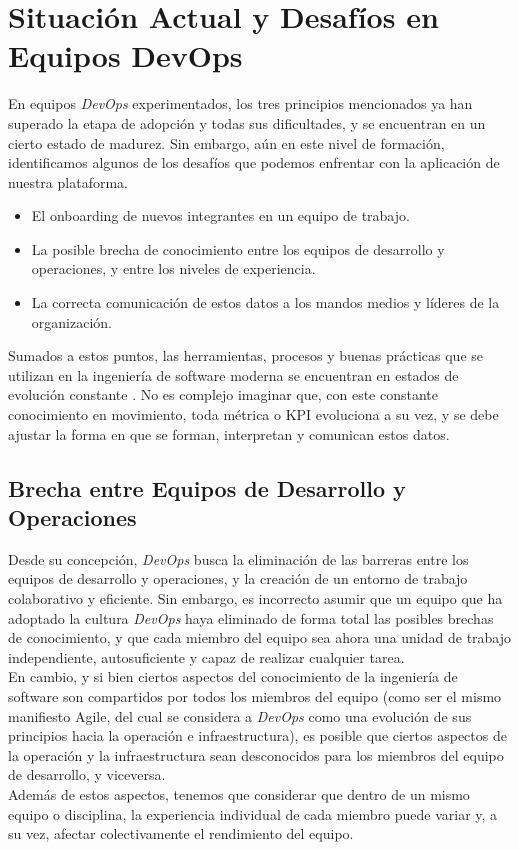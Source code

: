 \documentclass[journal]{IEEEtran}
\begin{document}
\section{\textbf{\Large Situación Actual y Desafíos en Equipos DevOps}}

En equipos \textit{DevOps} experimentados, los tres principios mencionados ya han superado la etapa de adopción y todas sus dificultades, y se encuentran en un cierto estado de madurez. Sin embargo, aún en este nivel de formación, identificamos algunos de los desafíos que podemos enfrentar con la aplicación de nuestra plataforma.
\begin{itemize}
    \item El onboarding de nuevos integrantes en un equipo de trabajo.
    \item La posible brecha de conocimiento entre los equipos de desarrollo y operaciones, y entre los niveles de experiencia.
    \item La correcta comunicación de estos datos a los mandos medios y líderes de la organización.
\end{itemize}

Sumados a estos puntos, las herramientas, procesos y buenas prácticas que se utilizan en la ingeniería de software moderna se encuentran en estados de evolución constante \cite{ayoup2022achievement}. No es complejo imaginar que, con este constante conocimiento en movimiento, toda métrica o KPI evoluciona a su vez, y se debe ajustar la forma en que se forman, interpretan y comunican estos datos.

\subsection{\textbf{Brecha entre Equipos de Desarrollo y Operaciones}}

Desde su concepción, \textit{DevOps} busca la eliminación de las barreras entre los equipos de desarrollo y operaciones, y la creación de un entorno de trabajo colaborativo y eficiente. 
Sin embargo, es incorrecto asumir que un equipo que ha adoptado la cultura \textit{DevOps} haya eliminado de forma total las posibles brechas de conocimiento, y que cada miembro del equipo sea ahora una unidad de trabajo independiente, autosuficiente y capaz de realizar cualquier tarea. 
\\En cambio, y si bien ciertos aspectos del conocimiento de la ingeniería de software son compartidos por todos los miembros del equipo (como ser el mismo manifiesto Agile\cite{amaro2024devops}, del cual se considera a \textit{DevOps} como una evolución de sus principios hacia la operación e infraestructura\cite[Part I. The Three Ways]{kim2021devops}), es posible que ciertos aspectos de la operación y la infraestructura sean desconocidos para los miembros del equipo de desarrollo, y viceversa.
\\Además de estos aspectos, tenemos que considerar que dentro de un mismo equipo o disciplina, la experiencia individual de cada miembro puede variar y, a su vez, afectar colectivamente el rendimiento del equipo.
\end{document}
